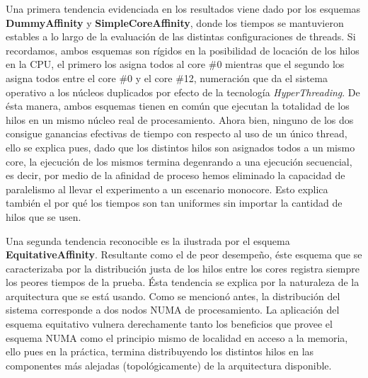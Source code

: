 Una primera tendencia evidenciada en los resultados viene dado por los esquemas \textbf{DummyAffinity} y \textbf{SimpleCoreAffinity}, donde los tiempos se mantuvieron estables a lo largo de la evaluación de las distintas configuraciones de threads. Si recordamos, ambos esquemas son rígidos en la posibilidad de locación de los hilos en la CPU, el primero los asigna todos al core \#0 mientras que el segundo los asigna todos entre el core \#0 y el core \#12, numeración que da el sistema operativo a los núcleos duplicados por efecto de la tecnología \emph{HyperThreading}. De ésta manera, ambos esquemas tienen en común que ejecutan la totalidad de los hilos en un mismo núcleo real de procesamiento. Ahora bien, ninguno de los dos consigue ganancias efectivas de tiempo con respecto al uso de un único thread, ello se explica pues, dado que los distintos hilos son asignados todos a un mismo core, la ejecución de los mismos termina degenrando a una ejecución secuencial, es decir, por medio de la afinidad de proceso hemos eliminado la capacidad de paralelismo al llevar el experimento a un escenario monocore. Esto explica también el por qué los tiempos son tan uniformes sin importar la cantidad de hilos que se usen.

Una segunda tendencia reconocible es la ilustrada por el esquema \textbf{EquitativeAffinity}. Resultante como el de peor desempeño, éste esquema que se caracterizaba por la distribución justa de los hilos entre los cores registra siempre los peores tiempos de la prueba. Ésta tendencia se explica por la naturaleza de la arquitectura que se está usando. Como se mencionó antes, la distribución del sistema corresponde a dos nodos NUMA de procesamiento. La aplicación del esquema equitativo vulnera derechamente tanto los beneficios que provee el esquema NUMA como el principio mismo de localidad en acceso a la memoria, ello pues en la práctica, termina distribuyendo los distintos hilos en las componentes más alejadas (topológicamente) de la arquitectura disponible.

